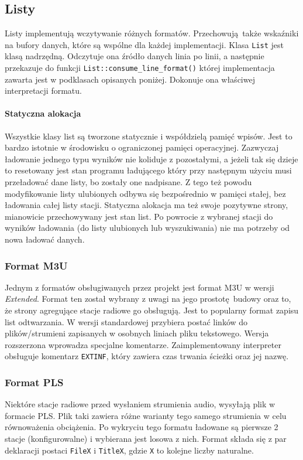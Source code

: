 \documentclass[polish]{aghengthesis}
\begin{document}
		\subsection{Listy}
			Listy implementują wczytywanie różnych formatów. Przechowują także wskaźniki na bufory danych, które są wspólne dla każdej implementacji. Klasa \lstinline|List| jest klasą nadrzędną. Odczytuje ona źródło danych linia po linii, a następnie przekazuje do funkcji \lstinline|List::consume_line_format()| której implementacja zawarta jest w podklasach opisanych poniżej. Dokonuje ona właściwej interpretacji formatu.
			
			\paragraph{Statyczna alokacja} Wszystkie klasy list są tworzone statycznie i współdzielą pamięć wpisów. Jest to bardzo istotnie w środowisku o ograniczonej pamięci operacyjnej. Zazwyczaj ładowanie jednego typu wyników nie koliduje z pozostałymi, a jeżeli tak się dzieje to resetowany jest stan programu ładującego który przy następnym użyciu musi przeładować dane listy, bo zostały one nadpisane. Z tego też powodu modyfikowanie listy ulubionych odbywa się bezpośrednio w pamięci stałej, bez ładowania całej listy stacji. Statyczna alokacja ma też swoje pozytywne strony, mianowicie przechowywany jest stan list. Po powrocie z wybranej stacji do wyników ładowania (do listy ulubionych lub wyszukiwania) nie ma potrzeby od nowa ładować danych.
			
			\subsubsection{Format M3U}
				Jednym z formatów obsługiwanych przez projekt jest format M3U\textsuperscript{\cite{m3u}} w wersji \textit{Extended}. Format ten został wybrany z uwagi na jego prostotę budowy oraz to, że strony agregujące stacje radiowe go obsługują. Jest to popularny format zapisu list odtwarzania. W wersji standardowej przybiera postać linków do plików/strumieni zapisanych w osobnych liniach pliku tekstowego. Wersja rozszerzona wprowadza specjalne komentarze. Zaimplementowany interpreter obsługuje komentarz \lstinline|EXTINF|, który zawiera czas trwania ścieżki oraz jej nazwę.
			
			\subsubsection{Format PLS}
				Niektóre stacje radiowe przed wysłaniem strumienia audio, wysyłają plik w formacie PLS\textsuperscript{\cite{pls}}. Plik taki zawiera różne warianty tego samego strumienia w celu równoważenia obciążenia. Po wykryciu tego formatu ładowane są pierwsze 2 stacje (konfigurowalne) i wybierana jest losowa z nich. Format składa się z par deklaracji postaci \lstinline|FileX| i \lstinline|TitleX|, gdzie \lstinline|X| to kolejne liczby naturalne.
			
\end{document}
